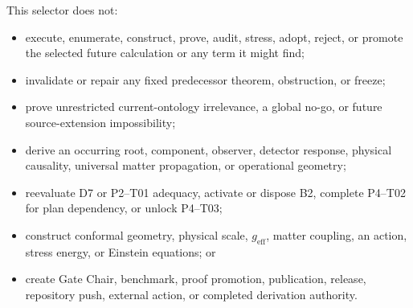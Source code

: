 \documentclass[11pt]{article}
\begin{document}
This selector does not:
\begin{itemize}
  \item execute, enumerate, construct, prove, audit, stress, adopt, reject, or
  promote the selected future calculation or any term it might find;
  \item invalidate or repair any fixed predecessor theorem, obstruction, or
  freeze;
  \item prove unrestricted current-ontology irrelevance, a global no-go, or
  future source-extension impossibility;
  \item derive an occurring root, component, observer, detector response,
  physical causality, universal matter propagation, or operational geometry;
  \item reevaluate D7 or P2--T01 adequacy, activate or dispose B2, complete
  P4--T02 for plan dependency, or unlock P4--T03;
  \item construct conformal geometry, physical scale, \(g_{\mathrm{eff}}\),
  matter coupling, an action, stress energy, or Einstein equations; or
  \item create Gate Chair, benchmark, proof promotion, publication, release,
  repository push, external action, or completed derivation authority.
\end{itemize}
\end{document}
